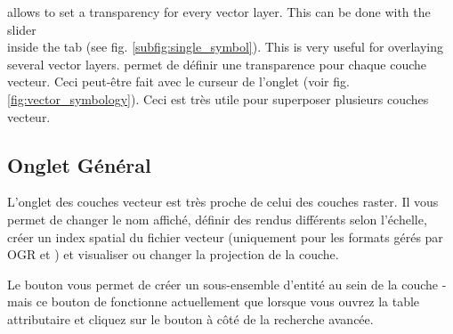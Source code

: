  \label{sec:vect_transparency} 

\qg allows to set a transparency for every vector layer. This can be done with
the slider \\
 inside the  tab (see
fig. \ref{subfig:single_symbol}). This is very useful for overlaying several
vector layers.
\qg permet de définir une transparence pour chaque couche vecteur. Ceci peut-être fait avec le curseur  de l'onglet  (voir fig. \ref{fig:vector_symbology}). Ceci est très utile pour superposer plusieurs couches vecteur.

\subsection{Onglet Général}\label{vectorgeneraltab}
L'onglet  des couches vecteur est très proche de celui des couches raster. Il vous permet de changer le nom affiché, définir des rendus différents selon l'échelle, créer un index spatial du fichier vecteur (uniquement pour les formats gérés par OGR et \pg) et visualiser ou changer la projection de la couche.

Le bouton  vous permet de créer un sous-ensemble d'entité au sein de la couche - mais ce bouton de fonctionne actuellement que lorsque vous ouvrez la table attributaire et cliquez sur le bouton \button{\dots} à côté de la recherche avancée.

